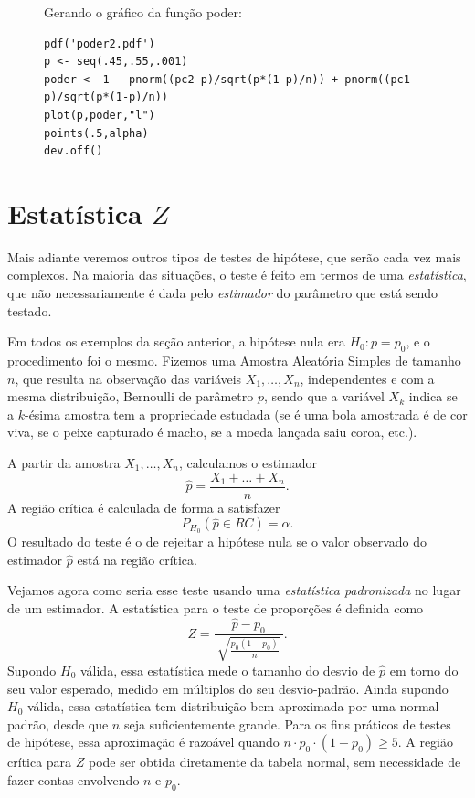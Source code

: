 \documentclass[12pt,a4paper]{article}
\theoremstyle{plain}
\theoremstyle{definition}
\theoremstyle{remark}
\begin{document}
\begin{figure}[H]
Gerando o gráfico da função poder:
\footnotesize
\begin{verbatim}
pdf('poder2.pdf')
p <- seq(.45,.55,.001)
poder <- 1 - pnorm((pc2-p)/sqrt(p*(1-p)/n)) + pnorm((pc1-p)/sqrt(p*(1-p)/n))
plot(p,poder,"l")
points(.5,alpha)
dev.off()
\end{verbatim}
\end{figure}

\section{Estatística $Z$}

Mais adiante veremos outros tipos de testes de hipótese, que serão cada vez mais complexos.
Na maioria das situações, o teste é feito em termos de uma \emph{estatística}, que não necessariamente é dada pelo \emph{estimador} do parâmetro que está sendo testado.

Em todos os exemplos da seção anterior, a hipótese nula era $H_0:p=p_0$, e o procedimento foi o mesmo.
Fizemos uma Amostra Aleatória Simples de tamanho $n$, que resulta na observação das variáveis $X_1,\dots,X_n$, independentes e com a mesma distribuição, Bernoulli de parâmetro $p$, sendo que a variável $X_k$ indica se a $k$-ésima amostra tem a propriedade estudada (se é uma bola amostrada é de cor viva, se o peixe capturado é macho, se a moeda lançada saiu coroa, etc.).

A partir da amostra $X_1,\dots,X_n$, calculamos o estimador
\[
\hat{p} = \frac{X_1 + \dots + X_n}{n}
.
\]
A região crítica é calculada de forma a satisfazer
\[
P_{H_0}(\hat{p} \in RC) = \alpha.
\]
O resultado do teste é o de rejeitar a hipótese nula se o valor observado do estimador $\hat{p}$ está na região crítica.

Vejamos agora como seria esse teste usando uma \emph{estatística padronizada} no lugar de um estimador.
A estatística para o teste de proporções é definida como
\[
Z = \frac{\hat{p}-p_0}{\ \sqrt{\frac{p_0(1-p_0)}{n}}\ }
.
\]
Supondo $H_0$ válida, essa estatística mede o tamanho do desvio de $\hat{p}$ em torno do seu valor esperado, medido em múltiplos do seu desvio-padrão.
Ainda supondo $H_0$ válida, essa estatística tem distribuição bem aproximada por uma normal padrão, desde que $n$ seja suficientemente grande.
Para os fins práticos de testes de hipótese, essa aproximação é razoável quando $n \cdot p_0 \cdot (1-p_0) \geq 5$.
A região crítica para $Z$ pode ser obtida diretamente da tabela normal, sem necessidade de fazer contas envolvendo $n$ e $p_0$.
\end{document}

